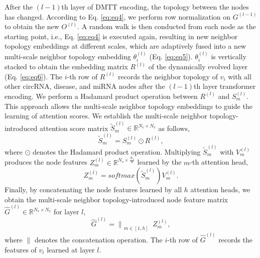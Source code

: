 \documentclass[journal,twoside,web]{ieeecolor}
\begin{document}
After the $(l-1)$th layer of DMTT encoding, the topology between the nodes has changed. According to Eq. \ref{eq:eq4}, we perform row normalization on $G^{(l - 1)}$ to obtain the new $O^{(l)}$. A random walk is then conducted from each node as the starting point, i.e., Eq. \ref{eq:eq4} is executed again, resulting in new neighbor topology embeddings at different scales, which are adaptively fused into a new multi-scale neighbor topology embedding $\theta_i^{(l)}$ (Eq. \ref{eq:eq5}). $\theta_i^{(l)}$ is vertically stacked to obtain the embedding matrix $R^{(l)}$ of the dynamically evolved layer (Eq. \ref{eq:eq6}). %
The $i$-th row of $R^{(l)}$ records the neighbor topology of $v_i$ with all other circRNA, disease, and miRNA nodes after the $(l-1)$th layer transformer encoding. We perform a Hadamard product operation between $R^{(l)}$ and $S_{m}^{(l)}$. This approach allows the multi-scale neighbor topology embeddings to guide the learning of attention scores. We establish the multi-scale neighbor topology-introduced attention score matrix $\widetilde{S}_{m}^{(l)} \in \mathbb{R}^{N_v \times N_v}$ as follows,
\begin{equation}
	\widetilde{S}_{m}^{(l)} = S_{m}^{(l)} \odot R^{(l)},
\end{equation}
where $\odot$ denotes the Hadamard product operation. Multiplying $\widetilde{S}_{m}^{(l)}$ with $V_{m}^{(l)}$ produces the node features ${Z_{m}^{(l)}} \in \mathbb{R}^{N_v \times \frac{N_v}{h}}$ learned by the $m$-th attention head,
\begin{equation}
	{Z_{m}^{(l)}} = softmax(\widetilde{S}_{m}^{(l)})V_{m}^{(l)}.
\end{equation}
Finally, by concatenating the node features learned by all $h$ attention heads, we obtain the multi-scale neighbor topology-introduced node feature matrix $\hat{G}^{(l)} \in \mathbb{R}^{N_v \times N_v}$ for layer $l$,
\begin{equation}
	\hat{G}^{(l)}= \bigg\|_{\substack{m\in {[1,h]}}} Z^{(l)}_{m},
\end{equation}
where $\|$ denotes the concatenation operation. The $i$-th row of $\hat{G}^{(l)}$ records the features of $v_i$ learned at layer $l$.
\end{document}

